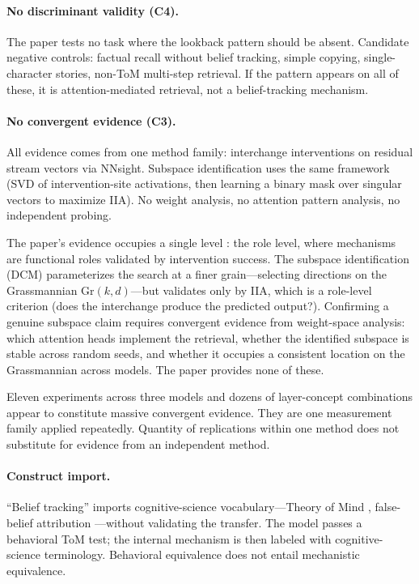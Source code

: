 \documentclass[11pt]{article}
\begin{document}
\paragraph{No discriminant validity (C4).}
The paper tests no task where the lookback pattern should be absent. Candidate negative controls: factual recall without belief tracking, simple copying, single-character stories, non-ToM multi-step retrieval. If the pattern appears on all of these, it is attention-mediated retrieval, not a belief-tracking mechanism.

\paragraph{No convergent evidence (C3).}
All evidence comes from one method family: interchange interventions on residual stream vectors via NNsight. Subspace identification uses the same framework (SVD of intervention-site activations, then learning a binary mask over singular vectors to maximize IIA). No weight analysis, no attention pattern analysis, no independent probing.

The paper's evidence occupies a single level \citep{tower2026mechviews}: the role level, where mechanisms are functional roles validated by intervention success. The subspace identification (DCM) parameterizes the search at a finer grain---selecting directions on the Grassmannian $\text{Gr}(k, d)$---but validates only by IIA, which is a role-level criterion (does the interchange produce the predicted output?). Confirming a genuine subspace claim requires convergent evidence from weight-space analysis: which attention heads implement the retrieval, whether the identified subspace is stable across random seeds, and whether it occupies a consistent location on the Grassmannian across models. The paper provides none of these.

Eleven experiments across three models and dozens of layer-concept combinations appear to constitute massive convergent evidence. They are one measurement family applied repeatedly. Quantity of replications within one method does not substitute for evidence from an independent method.

\paragraph{Construct import.}
``Belief tracking'' imports cognitive-science vocabulary---Theory of Mind \citep{premack1978chimpanzee}, false-belief attribution \citep{wimmer1983beliefs}---without validating the transfer. The model passes a behavioral ToM test; the internal mechanism is then labeled with cognitive-science terminology. Behavioral equivalence does not entail mechanistic equivalence.
\end{document}
